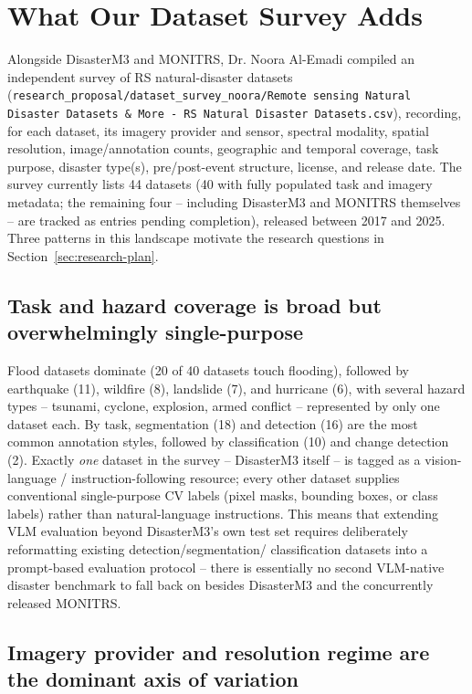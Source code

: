 \section{What Our Dataset Survey Adds}
\label{sec:dataset-landscape}

Alongside DisasterM3 and MONITRS, Dr. Noora Al-Emadi compiled an independent survey of
RS natural-disaster datasets
(\texttt{research\_proposal/dataset\_survey\_noora/Remote sensing Natural
Disaster Datasets \& More - RS Natural Disaster Datasets.csv}), recording, for each
dataset, its imagery provider and sensor, spectral modality, spatial
resolution, image/annotation counts, geographic and temporal coverage, task
purpose, disaster type(s), pre/post-event structure, license, and release
date. The survey currently lists 44 datasets (40 with fully populated task
and imagery metadata; the remaining four -- including DisasterM3 and MONITRS
themselves -- are tracked as entries pending completion), released between
2017 and 2025. Three patterns in this landscape motivate the research
questions in Section~\ref{sec:research-plan}.

\subsection{Task and hazard coverage is broad but overwhelmingly single-purpose}

Flood datasets dominate (20 of 40 datasets touch flooding), followed by
earthquake (11), wildfire (8), landslide (7), and hurricane (6), with several
hazard types -- tsunami, cyclone, explosion, armed conflict -- represented by
only one dataset each. By task, segmentation (18) and detection (16) are the
most common annotation styles, followed by classification (10) and change
detection (2). Exactly \emph{one} dataset in the survey -- DisasterM3 itself
-- is tagged as a vision-language / instruction-following resource; every
other dataset supplies conventional single-purpose CV labels (pixel masks,
bounding boxes, or class labels) rather than natural-language instructions.
This means that extending VLM evaluation beyond DisasterM3's own test set
requires deliberately reformatting existing detection/segmentation/
classification datasets into a prompt-based evaluation protocol -- there is
essentially no second VLM-native disaster benchmark to fall back on besides
DisasterM3 and the concurrently released MONITRS.

\subsection{Imagery provider and resolution regime are the dominant axis of variation}

